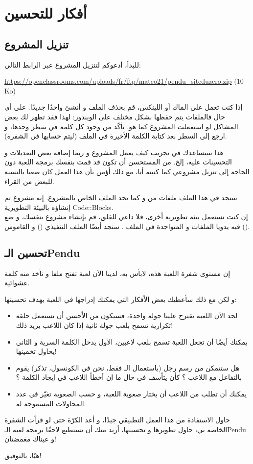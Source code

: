 \section*{أفكار للتحسين}

\subsection{تنزيل المشروع}

للبدأ، أدعوكم لتنزيل المشروع عبر الرابط التالي:

\url{https://openclassrooms.com/uploads/fr/ftp/mateo21/pendu_siteduzero.zip} \textenglish{(10 Ko)}

إذا كنت تعمل على الماك أو اللينكس، قم بحذف الملف
و أنشئ واحدًا جديدًا. على أي حال فالملفات يتم حفظها بشكل مختلف على الويندوز: لهذا فقد تظهر لك بعض المشاكل لو استعملت المشروع كما هو. تأكّد من وجود كل كلمة في سطر وحدها، و ارجع إلى السطر بعد كتابة الكلمة الأخيرة في الملف (ليتم حسابها في الشفرة).

هذا سيساعدك في تجريب كيف يعمل المشروع و ربما إضافة بعض التعديلات و التحسينات عليه، إلخ. من المستحسن أن تكون قد قمت بنفسك برمجة اللعبة دون الحاجة إلى تنزيل مشروعي كما كتبته أنا، مع ذلك أؤمن بأن هذا العمل كان صعبا بالنسبة للبعض من القراء.

ستجد في هذا الملف
ملفات من
 و
كما تجد الملف
الخاص بالمشروع. إنه مشروع تم إنشاؤه بالبيئة التطويرية
\textenglish{Code::Blocks}.\\
إن كنت تستعمل بيئة تطويرية أخرى، فلا داعي للقلق، قم بإنشاء مشروع بنفسك، و ضع فيه يدويا الملفات
و
المتواجدة في الملف
.
ستجد أيضًا الملف التنفيذي
()
و القاموس
().

\subsection{تحسين الـ\textenglish{Pendu}}

إن مستوى شفرة اللعبة هذه، لابأس به، لدينا الآن لعبة تفتح ملفا و تأخذ منه كلمة عشوائية.

و لكن مع ذلك سأعطيك بعض الأفكار التي يمكنك إدراجها في اللعبة بهدف تحسينها:

\begin{itemize}
  \item لحد الآن اللعبة تقترح علينا جولة واحدة، فسيكون من الأحسن أن نستعمل حلقة تكرارية تسمح بلعب جولة ثانية إذا كان اللاعب يريد ذلك!
  \item يمكنك أيضًا أن تجعل اللعبة تسمح بلعب لاعبين، الأول يدخل الكلمة السرية و الثاني يحاول تخمينها!
  \item هل ستتمكن من رسم رجل (باستعمال الـ
 فقط، نحن في الكونسول، تذكر) يقوم بالتفاعل مع اللاعب ؟ كأن يتأسف في حال ما إن أخطأ اللاعب في إيجاد الكلمة ؟
  \item يمكنك أن تطلب من اللاعب أن يختار صعوبة اللعبة، و حسب الصعوبة تغيّر في عدد المحاولات المسموحة له.
\end{itemize}

حاول الاستفادة من هذا العمل التطبيقي جيدًا، و أعد الكرّة حتى لو قرأت الشفرة الخاصة بي، حاول تطويرها و تحسينها، أريد منك أن تستطيع لاحقًا برمجة لعبة الـ\textenglish{Pendu}
و عيناك مغمضتان!

هيّا، بالتوفيق!

